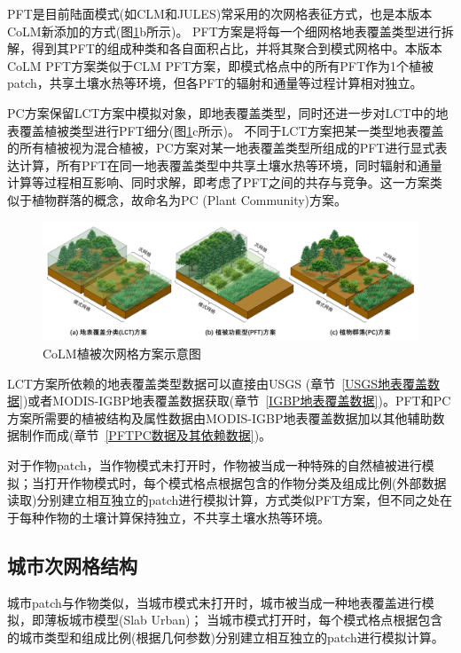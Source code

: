 PFT是目前陆面模式(如CLM和JULES)常采用的次网格表征方式，也是本版本CoLM新添加的方式(图\ref{fig:植被次网格方案}b所示)。
PFT方案是将每一个细网格地表覆盖类型进行拆解，得到其PFT的组成种类和各自面积占比，并将其聚合到模式网格中。本版本CoLM PFT方案类似于CLM PFT方案，即模式格点中的所有PFT作为1个植被patch，共享土壤水热等环境，但各PFT的辐射和通量等过程计算相对独立。

PC方案保留LCT方案中模拟对象，即地表覆盖类型，同时还进一步对LCT中的地表覆盖植被类型进行PFT细分(图\ref{fig:植被次网格方案}c所示)。
不同于LCT方案把某一类型地表覆盖的所有植被视为混合植被，PC方案对某一地表覆盖类型所组成的PFT进行显式表达计算，所有PFT在同一地表覆盖类型中共享土壤水热等环境，同时辐射和通量计算等过程相互影响、同时求解，即考虑了PFT之间的共存与竞争。这一方案类似于植物群落的概念，故命名为PC (Plant Community)方案。

{
\begin{figure}[htbp]
\centering
\includegraphics[width=\textwidth]{Figures/模式构架/植被次网格方案示意图-v2.jpg}
\caption{CoLM植被次网格方案示意图}
\label{fig:植被次网格方案}
\end{figure}
}

LCT方案所依赖的地表覆盖类型数据可以直接由USGS (章节~\ref{USGS地表覆盖数据})或者MODIS-IGBP地表覆盖数据获取(章节~\ref{IGBP地表覆盖数据})。PFT和PC方案所需要的植被结构及属性数据由MODIS-IGBP地表覆盖数据加以其他辅助数据制作而成(章节~\ref{PFTPC数据及其依赖数据})。

对于作物patch，当作物模式未打开时，作物被当成一种特殊的自然植被进行模拟；当打开作物模式时，每个模式格点根据包含的作物分类及组成比例(外部数据读取)分别建立相互独立的patch进行模拟计算，方式类似PFT方案，但不同之处在于每种作物的土壤计算保持独立，不共享土壤水热等环境。

\subsection{城市次网格结构}
城市patch与作物类似，当城市模式未打开时，城市被当成一种地表覆盖进行模拟，即薄板城市模型(Slab Urban)；
当城市模式打开时，每个模式格点根据包含的城市类型和组成比例(根据几何参数)分别建立相互独立的patch进行模拟计算。

